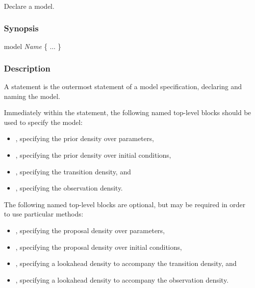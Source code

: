 \subsection{\label{model}}

Declare a model.

\subsubsection*{Synopsis\label{model_Synopsis}}
\begin{bicode}
    model \textsl{Name} \{
      \(\ldots\)
    \}
\end{bicode}

\subsubsection*{Description\label{model_Description}}

A  statement is the outermost statement of a model specification,
declaring and naming the model.

Immediately within the  statement, the following named top-level blocks should
be used to specify the model:
\begin{itemize}
\item {}, specifying the prior density over parameters,
\item {}, specifying the prior density over initial conditions,
\item {}, specifying the transition density, and
\item {}, specifying the observation density.
\end{itemize}

The following named top-level blocks are optional, but may be required in order to use particular methods:
\begin{itemize}
\item {}, specifying the proposal density over parameters,
\item {}, specifying the proposal density over initial conditions,
\item {}, specifying a lookahead density to accompany the transition density, and
\item {}, specifying a lookahead density to accompany the observation density.
\end{itemize}

